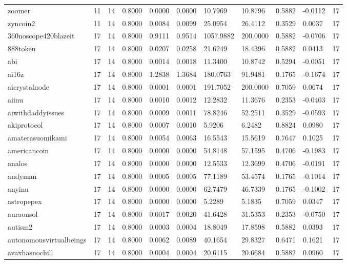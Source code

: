 \begin{table}[htbp]
\begin{tabular}{lllllllllll}
zoomer & 11 & 14 & 0.8000 & 0.0000 & 0.0000 & 10.7969 & 10.8796 & 0.5882 & -0.0112 & 17 \\
zyncoin2 & 11 & 14 & 0.8000 & 0.0084 & 0.0099 & 25.0954 & 26.4112 & 0.3529 & 0.0037 & 17 \\
360noscope420blazeit & 17 & 14 & 0.8000 & 0.9111 & 0.9514 & 1057.9882 & 200.0000 & 0.5882 & -0.0706 & 17 \\
888token & 17 & 14 & 0.8000 & 0.0207 & 0.0258 & 21.6249 & 18.4396 & 0.5882 & 0.0413 & 17 \\
abi & 17 & 14 & 0.8000 & 0.0014 & 0.0018 & 11.3400 & 10.8742 & 0.5294 & -0.0051 & 17 \\
ai16z & 17 & 14 & 0.8000 & 1.2838 & 1.3684 & 180.0763 & 91.9481 & 0.1765 & -0.1674 & 17 \\
aicrystalnode & 17 & 14 & 0.8000 & 0.0001 & 0.0001 & 191.7052 & 200.0000 & 0.7059 & 0.0674 & 17 \\
aiinu & 17 & 14 & 0.8000 & 0.0010 & 0.0012 & 12.2832 & 11.3676 & 0.2353 & -0.0403 & 17 \\
aiwithdaddyissues & 17 & 14 & 0.8000 & 0.0009 & 0.0011 & 78.8246 & 52.2511 & 0.3529 & -0.0593 & 17 \\
akiprotocol & 17 & 14 & 0.8000 & 0.0007 & 0.0010 & 5.9206 & 6.2482 & 0.8824 & 0.0980 & 17 \\
amaterasuomikami & 17 & 14 & 0.8000 & 0.0054 & 0.0063 & 16.5543 & 15.5619 & 0.7647 & 0.1025 & 17 \\
americancoin & 17 & 14 & 0.8000 & 0.0000 & 0.0000 & 54.8148 & 57.1595 & 0.4706 & -0.1983 & 17 \\
analos & 17 & 14 & 0.8000 & 0.0000 & 0.0000 & 12.5533 & 12.3699 & 0.4706 & -0.0191 & 17 \\
andyman & 17 & 14 & 0.8000 & 0.0005 & 0.0005 & 77.1189 & 53.4574 & 0.1765 & -0.1014 & 17 \\
anyinu & 17 & 14 & 0.8000 & 0.0000 & 0.0000 & 62.7479 & 46.7339 & 0.1765 & -0.1002 & 17 \\
astropepex & 17 & 14 & 0.8000 & 0.0000 & 0.0000 & 5.2289 & 5.1835 & 0.7059 & 0.0347 & 17 \\
auraonsol & 17 & 14 & 0.8000 & 0.0017 & 0.0020 & 41.6428 & 31.5353 & 0.2353 & -0.0750 & 17 \\
autism2 & 17 & 14 & 0.8000 & 0.0003 & 0.0004 & 18.8049 & 17.8598 & 0.5882 & 0.0393 & 17 \\
autonomousvirtualbeings & 17 & 14 & 0.8000 & 0.0062 & 0.0089 & 40.1654 & 29.8327 & 0.6471 & 0.1621 & 17 \\
avaxhasnochill & 17 & 14 & 0.8000 & 0.0004 & 0.0004 & 20.6115 & 20.6684 & 0.5882 & 0.0960 & 17 \\

\end{tabular}
\end{table}
